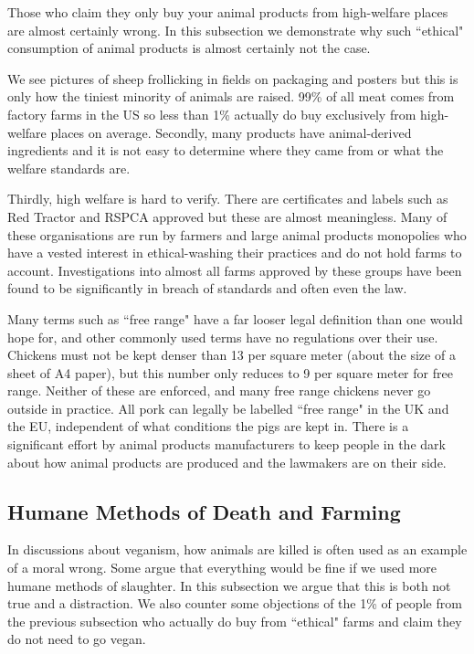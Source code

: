 Those who claim they only buy your animal products from high-welfare places are almost certainly wrong. In this subsection we demonstrate why such ``ethical" consumption of animal products is almost certainly not the case.

We see pictures of sheep frollicking in fields on packaging and posters but this is only how the tiniest minority of animals are raised. 99\% of all meat comes from factory farms in the US so less than 1\% actually do buy exclusively from high-welfare places on average. Secondly, many products have animal-derived ingredients and it is not easy to determine where they came from or what the welfare standards are.

Thirdly, high welfare is hard to verify. There are certificates and labels such as Red Tractor and RSPCA approved but these are almost meaningless. Many of these organisations are run by farmers and large animal products monopolies who have a vested interest in ethical-washing their practices and do not hold farms to account. Investigations into almost all farms approved by these groups have been found to be significantly in breach of standards and often even the law.

Many terms such as ``free range" have a far looser legal definition than one would hope for, and other commonly used terms have no regulations over their use. Chickens must not be kept denser than 13 per square meter (about the size of a sheet of A4 paper), but this number only reduces to 9 per square meter for free range. Neither of these are enforced, and many free range chickens never go outside in practice. All pork can legally be labelled ``free range" in the UK and the EU, independent of what conditions the pigs are kept in. There is a significant effort by animal products manufacturers to keep people in the dark about how animal products are produced and the lawmakers are on their side.

\subsection{Humane Methods of Death and Farming}
\label{sec:HumaneMethodsOfDeathAndFarming}

In discussions about veganism, how animals are killed is often used as an example of a moral wrong. Some argue that everything would be fine if we used more humane methods of slaughter. In this subsection we argue that this is both not true and a distraction. We also counter some objections of the 1\% of people from the previous subsection who actually do buy from ``ethical" farms and claim they do not need to go vegan.

